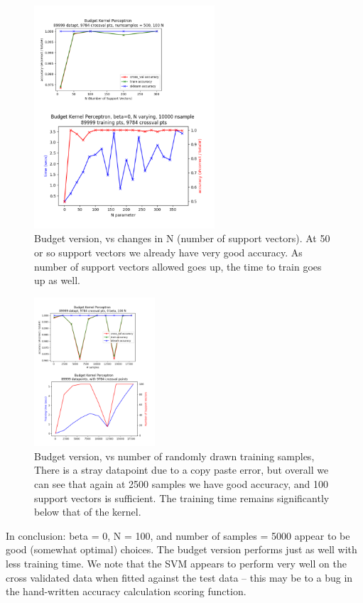 \documentclass[submit]{harvardml}
\newenvironment{answer}{%
    \color{answergreen}\bf}
  {%
  }
\begin{document}
\begin{enumerate}
\begin{answer}
            \begin{figure}[H]
                \centering
                \includegraphics[width=0.6\textwidth]{budget_N.png}
                \caption{Budget version, vs changes in N (number of support vectors). At 50 or so
                support vectors we already have very good accuracy. As number of support vectors
            allowed goes up, the time to train goes up as well. }
                \label{Problem 1, part 1.}
            \end{figure}


            \begin{figure}[H]
                \centering
                \includegraphics[width=0.4\textwidth]{budget_vs_numsamp.png}
                \caption{Budget version, vs number of randomly drawn training samples, There 
                is a stray datapoint due to a copy paste error, but overall we can see that again at 2500 samples we
            have good accuracy, and 100 support vectors is sufficient. The training time remains
        significantly below that of the kernel. }
                \label{Problem 1, part 1.}
            \end{figure}
            In conclusion: beta = 0, N = 100, and number of samples = 5000 appear to be good
            (somewhat optimal) choices. The budget version performs just as well with less training
            time. We note that the SVM appears to perform very well on the
            cross validated data when fitted against the test data -- this may be to a bug in the
            hand-written accuracy calculation scoring function.



\end{answer}
\end{enumerate}
\end{document}
